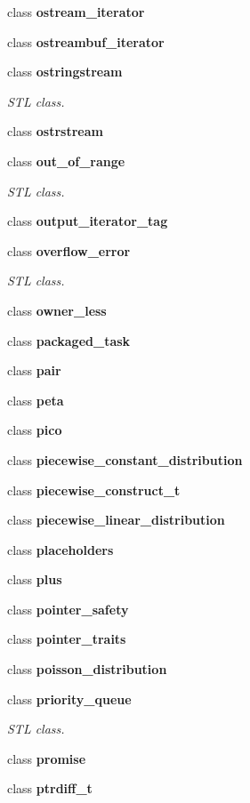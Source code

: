\begin{DoxyCompactItemize}
class \textbf{ ostream\+\_\+iterator}
\item 
class \textbf{ ostreambuf\+\_\+iterator}
\item 
class \textbf{ ostringstream}
\begin{DoxyCompactList}\small\item\em S\+TL class. \end{DoxyCompactList}\item 
class \textbf{ ostrstream}
\item 
class \textbf{ out\+\_\+of\+\_\+range}
\begin{DoxyCompactList}\small\item\em S\+TL class. \end{DoxyCompactList}\item 
class \textbf{ output\+\_\+iterator\+\_\+tag}
\item 
class \textbf{ overflow\+\_\+error}
\begin{DoxyCompactList}\small\item\em S\+TL class. \end{DoxyCompactList}\item 
class \textbf{ owner\+\_\+less}
\item 
class \textbf{ packaged\+\_\+task}
\item 
class \textbf{ pair}
\item 
class \textbf{ peta}
\item 
class \textbf{ pico}
\item 
class \textbf{ piecewise\+\_\+constant\+\_\+distribution}
\item 
class \textbf{ piecewise\+\_\+construct\+\_\+t}
\item 
class \textbf{ piecewise\+\_\+linear\+\_\+distribution}
\item 
class \textbf{ placeholders}
\item 
class \textbf{ plus}
\item 
class \textbf{ pointer\+\_\+safety}
\item 
class \textbf{ pointer\+\_\+traits}
\item 
class \textbf{ poisson\+\_\+distribution}
\item 
class \textbf{ priority\+\_\+queue}
\begin{DoxyCompactList}\small\item\em S\+TL class. \end{DoxyCompactList}\item 
class \textbf{ promise}
\item 
class \textbf{ ptrdiff\+\_\+t}

\end{DoxyCompactItemize}
